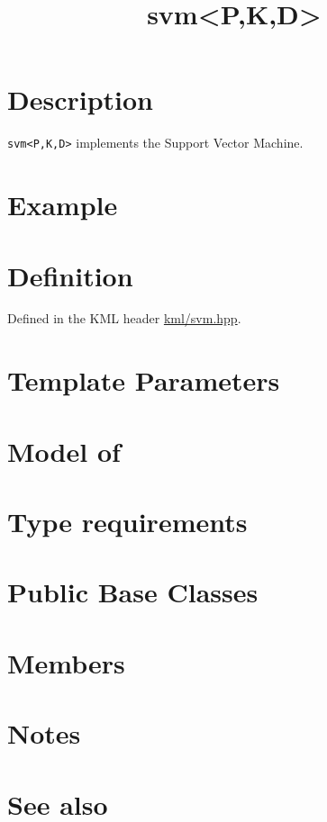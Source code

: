 \documentclass{article}
\begin{document}
\title{svm<P,K,D>}
\maketitle

\section*{Description}

\texttt{svm<P,K,D>} implements the Support Vector Machine. 

\section*{Example}
\section*{Definition}

Defined in the KML header \href{\kmlsvnroot/kml/svm.hpp}{kml/svm.hpp}.

\section*{Template Parameters}
\section*{Model of}
\section*{Type requirements}
\section*{Public Base Classes}
\section*{Members}
\section*{Notes}
\section*{See also}



\end{document}
